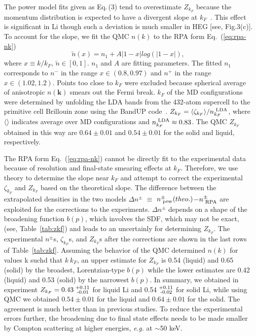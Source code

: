 \documentclass[twocolumn,showpacs,showkeys,fleqn,prl,superscriptaddress]{revtex4}%
\newcommand{\nn}[1]{\textnormal{ #1}}
\begin{document}
The power model fits given as Eq.\,(3) tend to overestimate $Z_{k_F}$ because the momentum distribution is expected to have a divergent slope at $k_F$~\cite{gg02}.
This effect is significant in Li though such a deviation is much smaller in HEG [see, Fig.3(c)].
To account for the slope, we fit the QMC $n(k)$ to the RPA form Eq.~(\ref{eq:rpa-nk})
\begin{equation} \label{eq:rpa-nk}
\tilde{n}(x) = n_1 + A\vert 1-x\vert log\left(\vert 1-x\vert\right),
\end{equation}
where $x\equiv k/k_F$, $\tilde{n}\in[0,1]$. $n_1$ and $A$ are fitting parameters. The fitted $n_1$ corresponds to $n^-$ in the range $x\in(0.8, 0.97)$ and $n^+$ in the range $x\in(1.02, 1.2)$. Points too close to $k_F$ were excluded because spherical average of anisotropic $n(\boldsymbol{k})$ smears out the Fermi break. $k_F$ of the MD configurations were determined by unfolding the LDA bands from the 432-atom supercell to the primitive cell Brillouin zone using the BandUP code~\cite{Medeiros2014,Medeiros2015}. $Z_{k_F} = \langle\zeta_{k_F}\rangle/n_{k_F}^{\nn{LDA}}$, where
$\langle\rangle$ indicates average over MD configurations and
$n_{k_F}^\nn{LDA}\approx0.83$. The QMC $Z_{k_F}$ obtained in this way are
$0.64\pm0.01$ and $0.54\pm0.01$
for the solid and liquid, respectively.

The RPA form Eq.~(\ref{eq:rpa-nk}) cannot be directly fit to the experimental data because of resolution and final-state smearing effects at $k_F$.
Therefore, we use theory to determine the slope near $k_F$ and attempt to correct the experimental $\zeta_{k_F}$ and $Z_{k_F}$ based on the theoretical slope.
The difference between the extrapolated densities in the two models $\Delta n^{\pm}$ $\equiv$ $n^{\pm}_{\nn{pow}} (theo.)$$-$$n^{\pm}_{\nn{RPA}}$ are exploited for the corrections to the experiments.
$\Delta n^{\pm}$ depends on a shape of the broadening function $b(p)$, which involves the SDF, which may not be exact, (see, Table~\ref{tab:zkf}) and leads to an uncertainly for determining $Z_{k_F}$.
The experimental $n^{\pm}$s, $\zeta_{k_F}$s, and $Z_{k_F}$s after the corrections are shown in the last rows of Table~\ref{tab:zkf}.
Assuming the behavior of the  QMC determined $n(k)$ for values k suchd that $k ~ k_F$, an upper estimate for $Z_{k_F}$ is  0.54 (liquid) and 0.65 (solid) by the broadest, Lorentzian-type $b(p)$ while the lower estimates are 0.42 (liquid) and 0.53 (solid) by the narrowest $b(p)$.
In summary, we obtained in experiment $Z_{k_F}=  0.43^{\nn{+0.11}}_{\nn{\;-0.01}}$ for liquid Li and 0.54$^{\nn{+0.11}}_{\nn{\;-0.02}}$ for solid Li, while using QMC we obtained $0.54\pm0.01$ for the liquid and $0.64\pm0.01$ for the solid.
The agreement is much better than in previous studies.
To reduce the experimental errors further, the broadening due to final state effects needs to be made smaller by Compton scattering at higher energies, {\it{e.g.}} at $\sim$50 keV.
\end{document}
